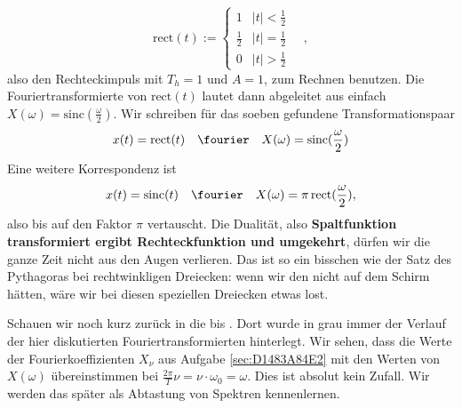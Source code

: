 \begin{Loesung}
\begin{equation}
\text{rect}(t) := \begin{cases} 1 & |t| < \frac{1}{2} \\ \frac{1}{2} & |t| = \frac{1}{2} \\ 0 & |t| > \frac{1}{2} \end{cases}\quad,
\end{equation}
also den Rechteckimpuls mit $T_h=1$ und $A=1$, zum Rechnen benutzen.
%
Die Fouriertransformierte von $\text{rect}(t)$ lautet dann abgeleitet aus
 einfach
$X(\omega) = \mathrm{sinc}(\frac{\omega}{2})$.
%
Wir schreiben für das soeben gefundene Transformationspaar
\begin{equation}
x(t) = \text{rect}(t) \quad \fourier \quad X(\omega) = \mathrm{sinc}(\frac{\omega}{2})
\end{equation}
%
Eine weitere Korrespondenz ist
\begin{equation}
x(t) = \text{sinc}(t) \quad \fourier \quad X(\omega) = \pi \, \mathrm{rect}(\frac{\omega}{2}),
\end{equation}
also bis auf den Faktor $\pi$ vertauscht.
%
Die Dualität, also \textbf{Spaltfunktion transformiert ergibt Rechteckfunktion und umgekehrt},
dürfen wir die ganze Zeit nicht aus den Augen verlieren. Das ist so ein bisschen
wie der Satz des Pythagoras bei rechtwinkligen Dreiecken: wenn wir den nicht auf dem Schirm hätten, wäre wir bei diesen speziellen Dreiecken etwas lost.

Schauen wir noch kurz zurück in die  bis .
Dort wurde in grau immer der Verlauf der hier diskutierten Fouriertransformierten
hinterlegt. Wir sehen, dass die Werte der Fourierkoeffizienten $X_\nu$
 aus Aufgabe \ref{sec:D1483A84E2}
mit den Werten von $X(\omega)$  übereinstimmen bei
$\frac{2\pi}{T} \nu = \nu \cdot \omega_0 = \omega$.
Dies ist absolut kein Zufall. Wir werden das später als Abtastung von Spektren kennenlernen.



\end{Loesung}

